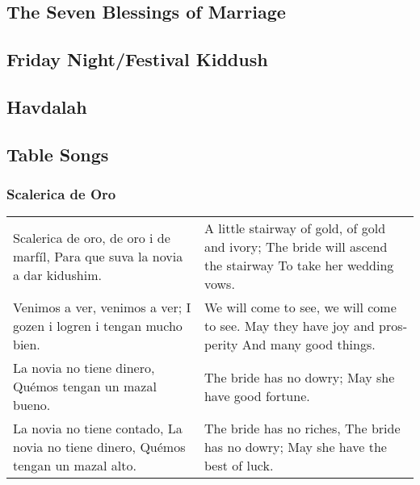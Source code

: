 ﻿\documentclass[a5paper, 12pt]{Birchon}
\begin{document}
\eject

\begin{english}
\subsection*{The Seven Blessings of Marriage}
\end{english}

\eject

\begin{english}
\section*{Friday Night/Festival Kiddush}
\end{english}

\eject

\begin{english}
\section*{Havdalah}
\end{english}

\eject

\begin{english}
\section*{Table Songs}

\subsubsection*{Scalerica de Oro}
\begin{tabu} to 1\textwidth { X[l] X[l] }
Scalerica de oro, de oro i de marfíl,
Para que suva la novia a dar kidushim.
&
A little stairway of gold, of gold and ivory;
The bride will ascend the stairway
To take her wedding vows.
\\
Venimos a ver, venimos a ver; \newline
I gozen i logren i tengan mucho bien.
&
We will come to see, we will come to see. \newline
May they have joy and prosperity
And many good things.
\\
La novia no tiene dinero,
Quémos tengan un mazal bueno.
&
The bride has no dowry;
May she have good fortune.
\\
La novia no tiene contado,
La novia no tiene dinero,
Quémos tengan un mazal alto.
&
The bride has no riches,
The bride has no dowry;
May she have the best of luck.
\end{tabu}

\end{english}
\end{document}
